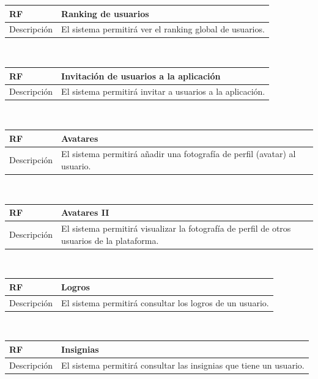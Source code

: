 \documentclass[twoside]{report}
\newcommand\addrow[2]{#1 &#2\\ }
\newcommand\addheading[2]{#1 &#2\\ \hline}
\newcommand\tabularhead{\begin{tabular}{lp{0.7\textwidth}}
\hline
}
\newenvironment{req}{\tabularhead}
{\hline\end{tabular}}
\begin{document}
\vspace{0.25cm}

\begin{req}
	\addheading{\textbf{RF\arabic{functionalRequirements}}}{Ranking de usuarios}
	\addrow{Descripción}{El sistema permitirá ver el ranking global de usuarios.}
\end{req}\\

\vspace{0.25cm}

\begin{req}
	\addheading{\textbf{RF\arabic{functionalRequirements}}}{Invitación de usuarios a la aplicación}
	\addrow{Descripción}{El sistema permitirá invitar a usuarios a la aplicación.}
\end{req}\\

\vspace{0.25cm}

\begin{req}
	\addheading{\textbf{RF\arabic{functionalRequirements}}}{Avatares}
	\addrow{Descripción}{El sistema permitirá añadir una fotografía de perfil (avatar) al usuario.}
\end{req}\\

\vspace{0.25cm}

\begin{req}
	\addheading{\textbf{RF\arabic{functionalRequirements}}}{Avatares II}
	\addrow{Descripción}{El sistema permitirá visualizar la fotografía de perfil de otros usuarios de la plataforma.}
\end{req}\\

\vspace{0.25cm}

\begin{req}
	\addheading{\textbf{RF\arabic{functionalRequirements}}}{Logros}
	\addrow{Descripción}{El sistema permitirá consultar los logros de un usuario.}
\end{req}\\

\vspace{0.25cm}

\begin{req}
	\addheading{\textbf{RF\arabic{functionalRequirements}}}{Insignias}
	\addrow{Descripción}{El sistema permitirá consultar las insignias que tiene un usuario.}
\end{req}\\
\end{document}
